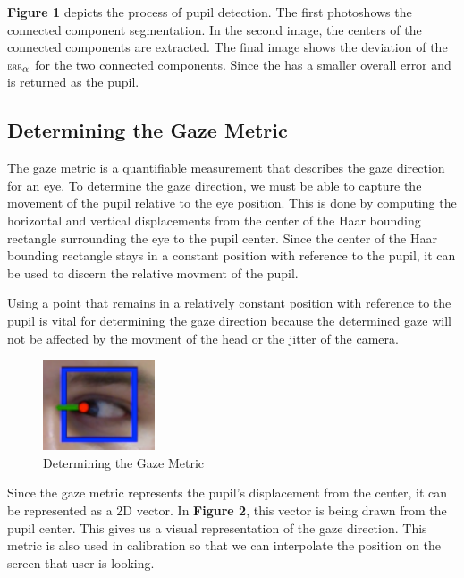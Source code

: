 \documentclass[annual]{acmsiggraph}
\newcommand{\Function}[1]{\ensuremath{{\small \textsc{#1}}}}
\begin{document}
\textbf{Figure 1} depicts the process of pupil detection. The first photoshows
the connected component segmentation. In the second image, the centers of the
connected components are extracted. The final image shows the deviation of the
$\Function{err}_{\alpha}$ for the two connected components.  Since the has a
smaller overall error and is returned as the pupil.

\subsection{Determining the Gaze Metric}

The gaze metric is a quantifiable measurement that describes the gaze direction
for an eye. To determine the gaze direction, we must be able to capture the
movement of the pupil relative to the eye position. This is done by computing
the horizontal and vertical displacements from the center of the Haar bounding
rectangle surrounding the eye to the pupil center. Since the center of the Haar
bounding rectangle stays in a constant position with reference to the pupil, it
can be used to discern the relative movment of the pupil.

Using a point that remains in a relatively constant position with reference to
the pupil is vital for determining the gaze direction because the determined
gaze will not be affected by the movment of the head or the jitter of the
camera.

\begin{figure}[ht]

    \centering

    \includegraphics[width=1.3in]{figs/gazePrediction.pdf}

    \caption{Determining the Gaze Metric}

\end{figure}

 Since the gaze metric represents the pupil's displacement from the center, it
 can be represented as a 2D vector. In \textbf{Figure 2}, this vector is being
 drawn from the pupil center. This gives us a visual representation of the gaze
 direction. This metric is also used in calibration so that we can interpolate
 the position on the screen that user is looking.
\end{document}
